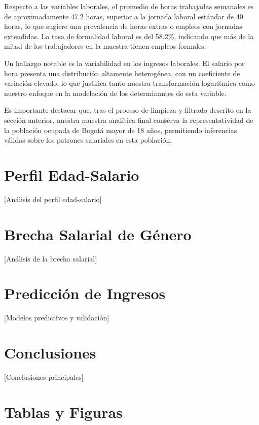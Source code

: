 \documentclass[12pt,a4paper,onecolumn]{article}
\begin{document}
Respecto a las variables laborales, el promedio de horas trabajadas semanales es de aproximadamente 47.2 horas, superior a la jornada laboral estándar de 40 horas, lo que sugiere una prevalencia de horas extras o empleos con jornadas extendidas. La tasa de formalidad laboral es del 58.2\%, indicando que más de la mitad de los trabajadores en la muestra tienen empleos formales.


Un hallazgo notable es la variabilidad en los ingresos laborales. El salario por hora presenta una distribución altamente heterogénea, con un coeficiente de variación elevado, lo que justifica tanto nuestra transformación logarítmica como nuestro enfoque en la modelación de los determinantes de esta variable.


Es importante destacar que, tras el proceso de limpieza y filtrado descrito en la sección anterior, nuestra muestra analítica final conserva la representatividad de la población ocupada de Bogotá mayor de 18 años, permitiendo inferencias válidas sobre los patrones salariales en esta población.


\section{Perfil Edad-Salario}
[Análisis del perfil edad-salario]


\section{Brecha Salarial de Género}
[Análisis de la brecha salarial]


\section{Predicción de Ingresos}
[Modelos predictivos y validación]


\section{Conclusiones}
[Conclusiones principales]


\pagebreak
\singlespacing

\pagebreak

\section*{Tablas y Figuras}
\end{document}
